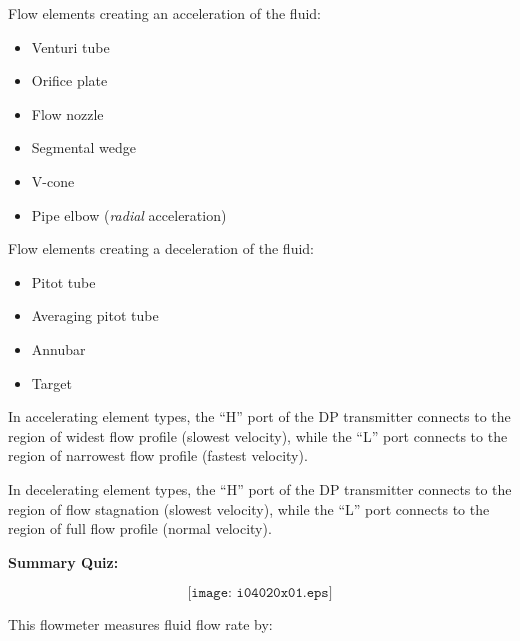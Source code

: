 












Flow elements creating an acceleration of the fluid:

\begin{itemize}
\item{} Venturi tube
\item{} Orifice plate
\item{} Flow nozzle
\item{} Segmental wedge
\item{} V-cone
\item{} Pipe elbow ({\it radial} acceleration)
\end{itemize}

\vskip 10pt

Flow elements creating a deceleration of the fluid:

\begin{itemize}
\item{} Pitot tube
\item{} Averaging pitot tube
\item{} Annubar
\item{} Target
\end{itemize}

\vskip 10pt

In accelerating element types, the ``H'' port of the DP transmitter connects to the region of widest flow profile (slowest velocity), while the ``L'' port connects to the region of narrowest flow profile (fastest velocity).

\vskip 10pt

In decelerating element types, the ``H'' port of the DP transmitter connects to the region of flow stagnation (slowest velocity), while the ``L'' port connects to the region of full flow profile (normal velocity).





\vfil \eject

\noindent
{\bf Summary Quiz:}

$$\texttt{[image: i04020x01.eps]}$$

\noindent
This flowmeter measures fluid flow rate by:

